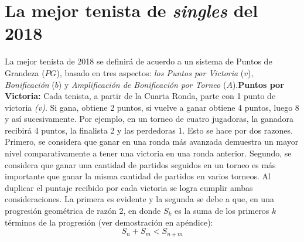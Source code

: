 \documentclass[a4paper]{article}
\begin{document}
\tableofcontents
\newpage
\section{La mejor tenista de \textit{singles} del 2018}
La mejor tenista de 2018 se definirá de acuerdo a un sistema de Puntos de Grandeza ($PG$), basado en tres aspectos: \textit{los Puntos por Victoria} ($v$), \textit{Bonificación} ($b$) y \textit{Amplificación de Bonificación por Torneo} ($A$).\newline  \newline \textbf{Puntos por Victoria:} Cada tenista, a partir de la Cuarta Ronda, parte con 1 punto de victoria \textit{(v)}. Si gana, obtiene 2 puntos, si vuelve a ganar obtiene 4 puntos, luego 8 y así sucesivamente. Por ejemplo, en un torneo de cuatro jugadoras, la ganadora recibirá 4 puntos, la finalista 2 y las perdedoras 1. 
 \newline \newline Esto se hace por dos razones. Primero, se considera que ganar en una ronda más avanzada demuestra un mayor nivel comparativamente a tener una victoria en una ronda anterior. Segundo, se considera que ganar una cantidad de partidos seguidos en un torneo es más importante que ganar la misma cantidad de partidos en varios torneos. \newline \newline Al duplicar el puntaje recibido por cada victoria se logra cumplir ambas consideraciones. La primera es evidente y la segunda se debe a que, en una progresión geométrica de razón 2, en donde $S_{k}$ es la suma de los primeros $k$ términos de la progresión (ver demostración en apéndice):
\begin{equation*}
    S_{n}+ S_{m} < S_{n+m}
\end{equation*}
\end{document}
